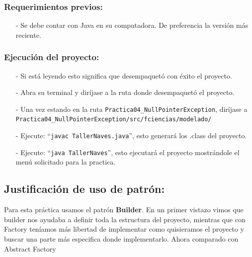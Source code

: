 \documentclass{article}
\newcommand{\code}[1]{\textcolor{white!25!black}{\texttt{#1}}}
\begin{document}
\subsubsection*{Requerimientos previos:}
\begin{itemize}
\item[-] Se debe contar con Java en su computadora. De preferencia la versión más reciente.
\end{itemize}

\subsubsection*{Ejecución del proyecto:}
\begin{itemize}
\item[-] Si está leyendo esto significa que desempaquetó con éxito el proyecto.
\item[-] Abra su terminal y diríjase a la ruta donde desempaquetó el proyecto.
\item[-] Una vez estando en la ruta \code{Practica04\_NullPointerException}, diríjase a
  \code{Practica04\_NullPointerException/src/fciencias/modelado/}
\item[-] Ejecute: “\code{javac TallerNaves.java}”, esto generará los .class del proyecto.
\item[-] Ejecute: “\code{java TallerNaves}”, esto ejecutará el proyecto mostrándole el menú solicitado para la practica.
\end{itemize}

\newpage
\subsection*{Justificación de uso de patrón:}
Para esta práctica usamos el patrón \textbf{Builder}. En un primer vistazo vimos que builder nos ayudaba a definir toda la estructura del proyecto, mientras que con Factory teníamos más libertad de implementar como quisieramos el proyecto y buscar una parte más especifica donde implementarlo. Ahora comparado con Abstract Factory
\end{document}
